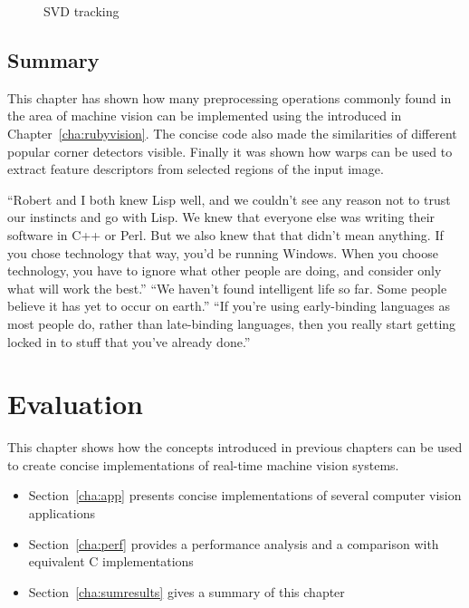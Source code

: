 \documentclass[12pt,a4paper,oneside,openright]{book}
\newcommand{\cha}[1]{Chapter~\ref{cha:#1}}
\newcommand{\sct}[1]{Section~\ref{cha:#1}}
\newcommand{\removed}[1]{\cbstart\removedfragile{#1}\cbend{}}
\newcommand{\removedfragile}[1]{{\color{red}{\sout{#1}}}{}}
\newcommand{\added}[1]{\cbstart\addedfragile{#1}\cbend{}}
\newcommand{\addedfragile}[1]{{\color{green!50!black}{\uline{#1}}}{}}
\newcommand{\removed}[1]{}
\newcommand{\removedfragile}[1]{}
\newcommand{\added}[1]{#1}
\newcommand{\addedfragile}[1]{#1}
\newcommand{\changed}[2]{\removed{#1}\added{#2}}
\begin{document}
\begin{CJK}{UTF8}{}
\begin{figure}[htbp]
\begin{center}
    \caption{\acs{SVD} tracking\label{fig:svdtrack}}
  \end{center}
\end{figure}

\section{Summary}\label{cha:sumvision}
This chapter has shown how many preprocessing operations commonly found in the area of machine vision can be implemented using the \changed{DSL}{library} introduced in \cha{rubyvision}. The concise code also made the similarities of different popular corner detectors visible. Finally it was shown how warps can be used to extract feature descriptors from selected regions of the input image.

\begin{savequote}[8cm]
  \begin{singlespace}
    ``Robert and I both knew Lisp well, and we couldn't see any reason not to trust our instincts and go with Lisp. We knew that everyone else was writing their software in C++ or Perl. But we also knew that that didn't mean anything. If you chose technology that way, you'd be running Windows. When you choose technology, you have to ignore what other people are doing, and consider only what will work the best.''
    ``We haven't found intelligent life so far. Some people believe it has yet to occur on earth.''
    ``If you're using early-binding languages as most people do, rather than late-binding languages, then you really start getting locked in to stuff that you've already done.''
  \end{singlespace}
\end{savequote}
\chapter{Evaluation}\label{cha:results}
This chapter shows how the concepts introduced in previous chapters can be used to create concise implementations of real-time machine vision systems.
\begin{itemize}
\item \sct{app} presents concise implementations of several computer vision applications
\item \sct{perf} provides a performance analysis and a comparison with equivalent C implementations
\item \sct{sumresults} gives a summary of this chapter
\end{itemize}


\end{CJK}
\end{document}
